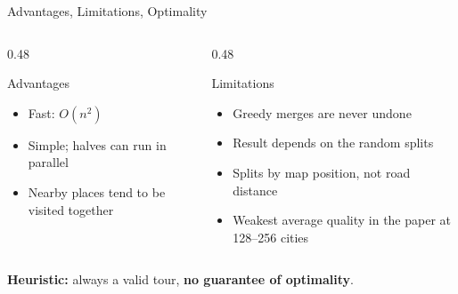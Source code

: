 \begin{frame}{Advantages, Limitations, Optimality}
  \begin{columns}[T]
    \begin{column}{0.48\textwidth}
      \begin{block}{Advantages}
        \small
        \begin{itemize}
          \item Fast: $O(n^2)$
          \item Simple; halves can run in parallel
          \item Nearby places tend to be visited together
        \end{itemize}
      \end{block}
    \end{column}
    \begin{column}{0.48\textwidth}
      \begin{block}{Limitations}
        \small
        \begin{itemize}
          \item Greedy merges are never undone
          \item Result depends on the random splits
          \item Splits by map position, not road distance
          \item Weakest average quality in the paper at 128--256 cities~\cite{lunagarcia2024performance}
        \end{itemize}
      \end{block}
    \end{column}
  \end{columns}
  \bigskip
  \begin{center}
    \textbf{Heuristic:} always a valid tour, \textbf{no guarantee of optimality}.
  \end{center}
\end{frame}
